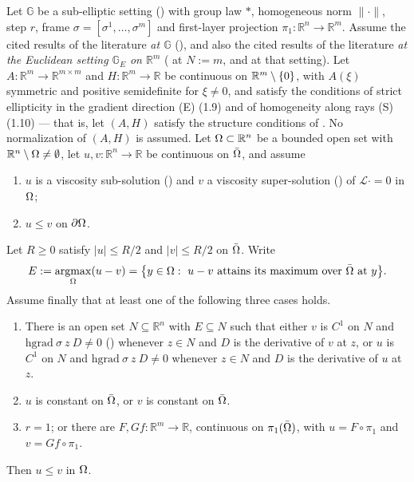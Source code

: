 \begin{theorem}[Theorem~1.3]
Let $\mathbb G$ be a sub-elliptic setting () with group law $*$,
homogeneous norm $\|\cdot\|$, step $r$, frame $\sigma=[\sigma^1,\ldots,\sigma^m]$ and
first-layer projection $\pi_1:\mathbb R^{n}\to\mathbb R^{m}$. Assume the cited results of the
literature \emph{at $\mathbb G$} (), and also the cited results of the
literature \emph{at the Euclidean setting $\mathbb G_E$ on $\mathbb R^{m}$}
( at $N:=m$, and  at that setting). Let
$A:\mathbb R^{m}\to\mathbb R^{m\times m}$ and $H:\mathbb R^{m}\to\mathbb R$ be continuous on
$\mathbb R^{m}\setminus\{0\}$, with $A(\xi)$ symmetric and positive semidefinite for $\xi\ne0$,
and satisfy the conditions of strict ellipticity in the gradient direction (E) (1.9) and of
homogeneity along rays (S) (1.10) --- that is, let $(A,H)$ satisfy the structure conditions
of . No normalization of $(A,H)$ is assumed. Let
$\Omega\subset\mathbb R^{n}$ be a bounded open set with $\mathbb R^{n}\setminus\Omega\ne\emptyset$, let
$u,v:\mathbb R^{n}\to\mathbb R$ be continuous on $\bar{\Omega}$, and assume
\begin{enumerate}
\item $u$ is a viscosity sub-solution () and $v$ a viscosity
  super-solution () of $\mathcal L\cdot=0$ in $\Omega$;
\item $u\le v$ on $\partial\Omega$.
\end{enumerate}
Let $R\ge0$ satisfy $|u|\le R/2$ and $|v|\le R/2$ on $\bar{\Omega}$. Write
\[
 E:=\argmax_\Om(u-v)=\big\{y\in\Om:\ u-v\ \text{attains its maximum over}\ \bar\Om\ \text{at}\ y\big\}.
\]
Assume finally that at least one of the following three cases holds.
\begin{enumerate}
\item[(i)] There is an open set $N\subseteq\mathbb R^{n}$ with $E\subseteq N$ such that
  either $v$ is $C^{1}$ on $N$ and $\mathrm{hgrad}\ \sigma\ z\ D\ne0$ ()
  whenever $z\in N$ and $D$ is the derivative of $v$ at $z$, or $u$ is $C^{1}$ on $N$ and
  $\mathrm{hgrad}\ \sigma\ z\ D\ne0$ whenever $z\in N$ and $D$ is the derivative of $u$
  at $z$.
\item[(ii)] $u$ is constant on $\bar{\Omega}$, or $v$ is constant on $\bar{\Omega}$.
\item[(iii)] $r=1$; or there are $F,Gf:\mathbb R^{m}\to\mathbb R$, continuous on
  $\pi_1(\bar{\Omega})$, with $u=F\circ\pi_1$ and $v=Gf\circ\pi_1$.
\end{enumerate}
Then $u\le v$ in $\Omega$.
\end{theorem}
